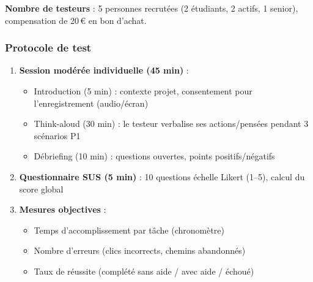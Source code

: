 \textbf{Nombre de testeurs} : 5 personnes recrutées (2 étudiants, 2 actifs, 1 senior), compensation de 20\,€ en bon d'achat.

\subsubsection{Protocole de test}

\begin{enumerate}
  \item \textbf{Session modérée individuelle (45 min)} :
    \begin{itemize}
      \item Introduction (5 min) : contexte projet, consentement pour l'enregistrement (audio/écran)
      \item Think-aloud (30 min) : le testeur verbalise ses actions/pensées pendant 3 scénarios P1
      \item Débriefing (10 min) : questions ouvertes, points positifs/négatifs
    \end{itemize}
  \item \textbf{Questionnaire SUS (5 min)} : 10 questions échelle Likert (1--5), calcul du score global
  \item \textbf{Mesures objectives} :
    \begin{itemize}
      \item Temps d'accomplissement par tâche (chronomètre)
      \item Nombre d'erreurs (clics incorrects, chemins abandonnés)
      \item Taux de réussite (complété sans aide / avec aide / échoué)
    \end{itemize}
\end{enumerate}

